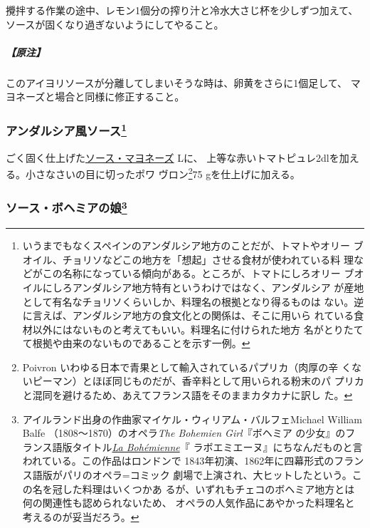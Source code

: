 \begin{recette}
攪拌する作業の途中、レモン1個分の搾り汁と冷水大さじ\undemi{}杯を少しずつ加えて、ソースが固くなり過ぎないようにしてやること。

\hypertarget{nota-sauce-aioli}{%
\subparagraph{【原注】}\label{nota-sauce-aioli}}

このアイヨリソースが分離してしまいそうな時は、卵黄をさらに1個足して、
マヨネーズと場合と同様に修正すること。

\hypertarget{sauce-andalouse}{%
\subsubsection[アンダルシア風ソース]{\texorpdfstring{アンダルシア風ソース\footnote{いうまでもなくスペインのアンダルシア地方のことだが、トマトやオリー
  ブオイル、チョリソなどこの地方を「想起」させる食材が使われている料
  理などがこの名称になっている傾向がある。ところが、トマトにしろオリー
  ブオイルにしろアンダルシア地方特有というわけではなく、アンダルシア
  が産地として有名なチョリソくらいしか、料理名の根拠となり得るものは
  ない。逆に言えば、アンダルシア地方の食文化との関係は、そこに用いら
  れている食材以外にはないものと考えてもいい。料理名に付けられた地方
  名がとりたてて根拠や由来のないものであることを示す一例。}}{アンダルシア風ソース}}\label{sauce-andalouse}}



ごく固く仕上げた\protect\hyperlink{mayonnaise}{ソース・マヨネーズ}\troisquarts{}
Lに、
上等な赤いトマトピュレ2\undemi{}dlを加える。小さなさいの目に切ったポワ
ヴロン\footnote{Poivron
  いわゆる日本で青果として輸入されているパプリカ（肉厚の辛
  くないピーマン）とほぼ同じものだが、香辛料として用いられる粉末のパ
  プリカと混同を避けるため、あえてフランス語をそのままカタカナに訳し
  た。}75 gを仕上げに加える。

\hypertarget{sauce-bohemienne}{%
\subsubsection[ソース・ボヘミアの娘]{\texorpdfstring{ソース・ボヘミアの娘\footnote{アイルランド出身の作曲家マイケル・ウィリアム・バルフェMichael
  William Balfe （1808〜1870）のオペラ\emph{The Bohemien Girl}『ボヘミア
  の少女』のフランス語版タイトル\href{https://archive.org/details/labohmiennegrand00balf}{\emph{La
  Bohémienne}}『
  ラボエミエーヌ』にちなんだものと言われている。この作品はロンドンで
  1843年初演、1862年に四幕形式のフランス語版がパリのオペラ=コミック
  劇場で上演され、大ヒットしたという。この名を冠した料理はいくつかあ
  るが、いずれもチェコのボヘミア地方とは何の関連性も認められないため、
  オペラの人気作品にあやかった料理名と考えるのが妥当だろう。}}{ソース・ボヘミアの娘}}\label{sauce-bohemienne}}


\end{recette}
